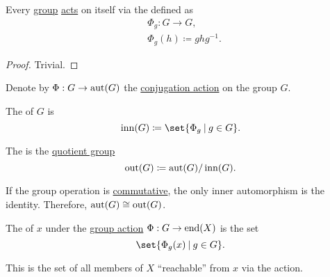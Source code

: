 \begin{proposition}\label{thm:group_conjugation_action}
  Every \hyperref[def:group]{group} \hyperref[def:group_action]{acts} on itself via the  defined as
  \begin{equation*}
    \begin{aligned}
      &\Phi_g: G \to G, \\
      &\Phi_g(h) \coloneqq g h g^{-1}.
    \end{aligned}
  \end{equation*}
\end{proposition}
\begin{proof}
  Trivial.
\end{proof}

\begin{definition}\label{def:inner_and_outer_automorphisms}
  Denote by \( \Phi: G \to \operatorname{aut}(G) \) the \hyperref[thm:group_conjugation_action]{conjugation action} on the group \( G \).

  The  of \( G \) is
  \begin{equation*}
    \op{inn}(G) \coloneqq \set{ \Phi_g \given g \in G }.
  \end{equation*}

  The  is the \hyperref[def:quotient_group]{quotient group}
  \begin{equation*}
    \operatorname{out}(G) \coloneqq \operatorname{aut}(G) / \operatorname{inn}(G).
  \end{equation*}
\end{definition}

\begin{example}\label{ex:integer_automorphism_groups}
  If the group operation is \hyperref[def:magma/commutative]{commutative}, the only inner automorphism is the identity. Therefore, \( \operatorname{aut}(G) \cong \operatorname{out}(G) \).
\end{example}

\begin{definition}\label{def:group_action_orbit}
  The  of \( x \) under the \hyperref[def:group_action]{group action} \( \Phi: G \to \operatorname{end}(X) \) is the set
  \begin{equation*}
    \set{ \Phi_g(x) \given g \in G }.
  \end{equation*}

  This is the set of all members of \( X \) \enquote{reachable} from \( x \) via the action.
\end{definition}

